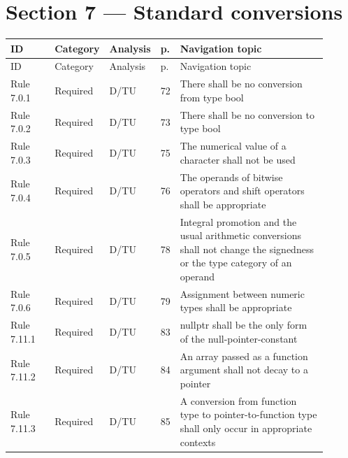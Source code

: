 \documentclass[10pt,letterpaper]{article}
\begin{document}
\section{Section 7 --- Standard conversions}
\small\setlength{\tabcolsep}{3pt}\renewcommand{\arraystretch}{1.15}
\begin{longtable}{p{0.14\linewidth}p{0.14\linewidth}p{0.1\linewidth}p{0.045\linewidth}p{0.475\linewidth}}
\toprule
ID & Category & Analysis & p. & Navigation topic\\ \midrule
\endfirsthead
\toprule
ID & Category & Analysis & p. & Navigation topic\\ \midrule
\endhead
Rule 7.0.1 & Required & D/TU & 72 & There shall be no conversion from type bool\\
Rule 7.0.2 & Required & D/TU & 73 & There shall be no conversion to type bool\\
Rule 7.0.3 & Required & D/TU & 75 & The numerical value of a character shall not be used\\
Rule 7.0.4 & Required & D/TU & 76 & The operands of bitwise operators and shift operators shall be appropriate\\
Rule 7.0.5 & Required & D/TU & 78 & Integral promotion and the usual arithmetic conversions shall not change the signedness or the type category of an operand\\
Rule 7.0.6 & Required & D/TU & 79 & Assignment between numeric types shall be appropriate\\
Rule 7.11.1 & Required & D/TU & 83 & nullptr shall be the only form of the null-pointer-constant\\
Rule 7.11.2 & Required & D/TU & 84 & An array passed as a function argument shall not decay to a pointer\\
Rule 7.11.3 & Required & D/TU & 85 & A conversion from function type to pointer-to-function type shall only occur in appropriate contexts\\
\bottomrule
\end{longtable}
\normalsize
\end{document}
